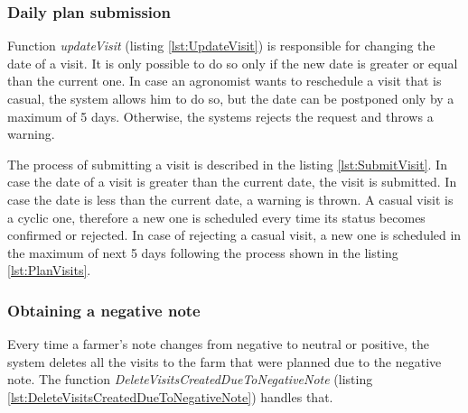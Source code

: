 

\subsubsection*{Daily plan submission}

Function \textit{updateVisit} (listing \ref{lst:UpdateVisit}) is responsible for changing the date of a visit. It is only possible to do so only if the new date is greater or equal than the current one. In case an agronomist wants to reschedule a visit that is casual, the system allows him to do so, but the date can be postponed only by a maximum of 5 days. Otherwise, the systems rejects the request and throws a warning.



The process of submitting a visit is described in the listing \ref{lst:SubmitVisit}. In case the date of a visit is greater than the current date, the visit is submitted. In case the date is less than the current date, a warning is thrown. A casual visit is a cyclic one, therefore a new one is scheduled every time its status becomes confirmed or rejected. In case of rejecting a casual visit, a new one is scheduled in the maximum of next 5 days following the process shown in the listing \ref{lst:PlanVisits}.



\subsubsection*{Obtaining a negative note}

Every time a farmer's note changes from negative to neutral or positive, the system deletes all the visits to the farm that were planned due to the negative note. The function \textit{DeleteVisitsCreatedDueToNegativeNote} (listing \ref{lst:DeleteVisitsCreatedDueToNegativeNote}) handles that.



